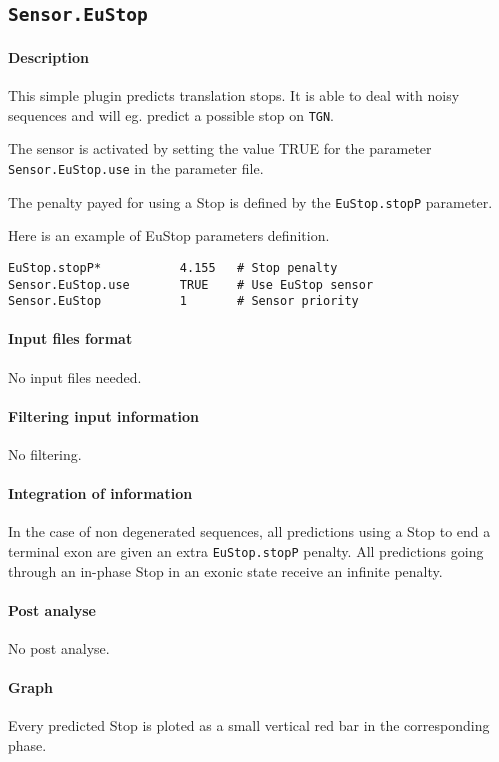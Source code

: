 
\subsection{\texttt{Sensor.EuStop}}

\paragraph{Description}

This simple plugin predicts translation stops. It is able to deal with
noisy sequences and will eg. predict a possible stop on \texttt{TGN}.

The sensor is activated by setting the value TRUE for the parameter
\texttt{Sensor.EuStop.use} in the parameter file.

The penalty payed for using a Stop is defined by the
\texttt{EuStop.stopP} parameter.

Here is an example of EuStop parameters definition.
\begin{Verbatim}[fontsize=\small]
EuStop.stopP*           4.155   # Stop penalty
Sensor.EuStop.use       TRUE    # Use EuStop sensor
Sensor.EuStop           1       # Sensor priority
\end{Verbatim}

\paragraph{Input files format}

No input files  needed.

\paragraph{Filtering input information}

No filtering.

\paragraph{Integration of information}

In the case of non degenerated sequences, all predictions using a Stop
to end a terminal exon are given an extra \texttt{EuStop.stopP}
penalty. All predictions going through an in-phase Stop in an exonic
state receive an infinite penalty.

\paragraph{Post analyse}

No post analyse.

\paragraph{Graph}

Every predicted Stop is ploted as a small vertical red bar in the
corresponding phase.


